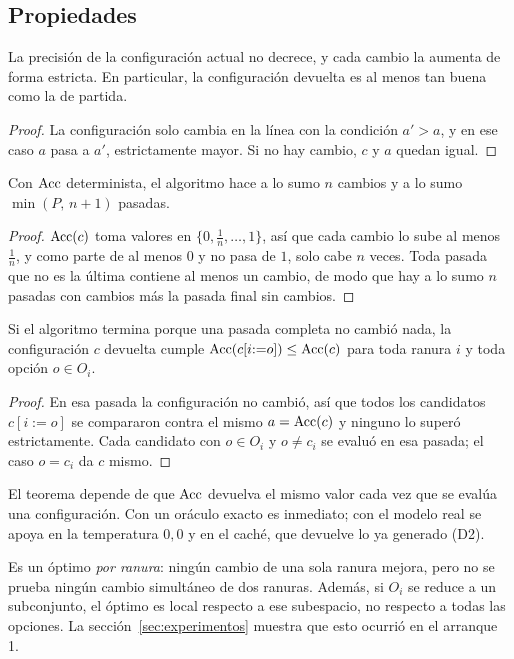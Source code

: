 \subsection{Propiedades}

\begin{lema}[Monotonía]\label{lem:monotonia}
La precisión de la configuración actual no decrece, y cada cambio la aumenta de forma
estricta. En particular, la configuración devuelta es al menos tan buena como la de partida.
\end{lema}
\begin{proof}
La configuración solo cambia en la línea con la condición $a'>a$, y en ese caso $a$ pasa a
$a'$, estrictamente mayor. Si no hay cambio, $c$ y $a$ quedan igual.
\end{proof}

\begin{lema}[Terminación]\label{lem:terminacion}
Con $\operatorname{Acc}$ determinista, el algoritmo hace a lo sumo $n$ cambios y a lo sumo
$\min(P,\,n+1)$ pasadas.
\end{lema}
\begin{proof}
$\operatorname{Acc}(c)$ toma valores en $\{0,\tfrac1n,\dots,1\}$, así que cada cambio lo sube al menos
$\tfrac1n$, y como parte de al menos $0$ y no pasa de $1$, solo cabe $n$ veces. Toda pasada
que no es la última contiene al menos un cambio, de modo que hay a lo sumo $n$ pasadas con
cambios más la pasada final sin cambios.
\end{proof}

\begin{teorema}\label{teo:optimo-local}
Si el algoritmo termina porque una pasada completa no cambió nada, la configuración $c$
devuelta cumple $\operatorname{Acc}(c[i{:=}o])\le\operatorname{Acc}(c)$ para toda ranura $i$ y toda opción $o\in O_i$.
\end{teorema}
\begin{proof}
En esa pasada la configuración no cambió, así que todos los candidatos $c[i{:=}o]$ se
compararon contra el mismo $a=\operatorname{Acc}(c)$ y ninguno lo superó estrictamente. Cada candidato con
$o\in O_i$ y $o\ne c_i$ se evaluó en esa pasada; el caso $o=c_i$ da $c$ mismo.
\end{proof}

El teorema depende de que $\operatorname{Acc}$ devuelva el mismo valor cada vez que se evalúa una
configuración. Con un oráculo exacto es inmediato; con el modelo real se apoya en la
temperatura $0{,}0$ y en el caché, que devuelve lo ya generado (D2).

Es un óptimo \emph{por ranura}: ningún cambio de una sola ranura mejora, pero no se prueba
ningún cambio simultáneo de dos ranuras. Además, si $O_i$ se reduce a un subconjunto, el
óptimo es local respecto a ese subespacio, no respecto a todas las opciones. La
sección~\ref{sec:experimentos} muestra que esto ocurrió en el arranque 1.


